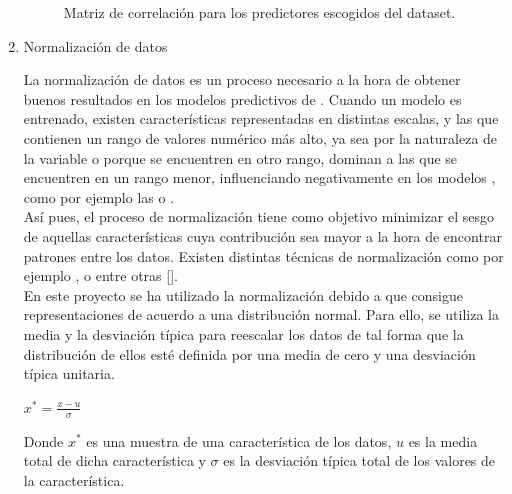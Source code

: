 \begin{enumerate}
                    \begin{figure}[H]
                        \centering
                        
                        \caption{Matriz de correlación para los predictores escogidos del dataset.}
                        \label{CorrelationMatrixImage}
                     \end{figure}


                \item Normalización de datos

                    La normalización de datos es un proceso necesario a la hora de obtener buenos resultados en los modelos predictivos de . Cuando un modelo es entrenado, existen características representadas en distintas escalas, y las que contienen un rango de valores numérico más alto, ya sea por la naturaleza de la variable o porque se encuentren en otro rango, dominan a las que se encuentren en un rango menor, influenciando negativamente en los modelos , como por ejemplo las  o  \cite{NormalizationSensitiveModels}.\\

                    Así pues, el proceso de normalización tiene como objetivo minimizar el sesgo de aquellas características cuya contribución sea mayor a la hora de encontrar patrones entre los datos. Existen distintas técnicas de normalización como por ejemplo ,  o  entre otras [\cite{DataNormalizationInvestigation}].\\


                    En este proyecto se ha utilizado la normalización  debido a que consigue representaciones de acuerdo a una distribución normal. Para ello, se utiliza la media y la desviación típica para reescalar los datos de tal forma que la distribución de ellos esté definida por una media de cero y una desviación típica unitaria.\\

                   \begin{center}
                        $x^* = \frac{x - u}{\sigma}$
                    \end{center}


                    Donde $x^*$ es una muestra de una característica de los datos, $u$ es la media total de dicha característica y $\sigma$ es la desviación típica total de los valores de la característica.


\end{enumerate}
